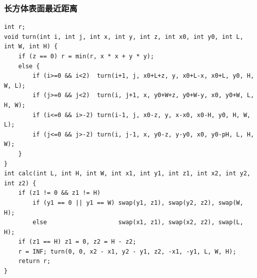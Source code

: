 \documentclass[landscape,a4paper]{article}
\begin{document}
\begin{spacing}{0.3}
\begin{multicols}{2}
\subsubsection{长方体表面最近距离}
\begin{lstlisting}
int r;
void turn(int i, int j, int x, int y, int z, int x0, int y0, int L, int W, int H) {
	if (z == 0) r = min(r, x * x + y * y);
	else {
		if (i>=0 && i<2)  turn(i+1, j, x0+L+z, y, x0+L-x, x0+L, y0, H, W, L);
		if (j>=0 && j<2)  turn(i, j+1, x, y0+W+z, y0+W-y, x0, y0+W, L, H, W);
		if (i<=0 && i>-2) turn(i-1, j, x0-z, y, x-x0, x0-H, y0, H, W, L);
		if (j<=0 && j>-2) turn(i, j-1, x, y0-z, y-y0, x0, y0-pH, L, H, W);
	}
}
int calc(int L, int H, int W, int x1, int y1, int z1, int x2, int y2, int z2) {
	if (z1 != 0 && z1 != H)
		if (y1 == 0 || y1 == W) swap(y1, z1), swap(y2, z2), swap(W, H);
		else                    swap(x1, z1), swap(x2, z2), swap(L, H);
	if (z1 == H) z1 = 0, z2 = H - z2;
	r = INF; turn(0, 0, x2 - x1, y2 - y1, z2, -x1, -y1, L, W, H);
	return r;
}
\end{lstlisting}


\end{multicols}
\end{spacing}
\end{document}
